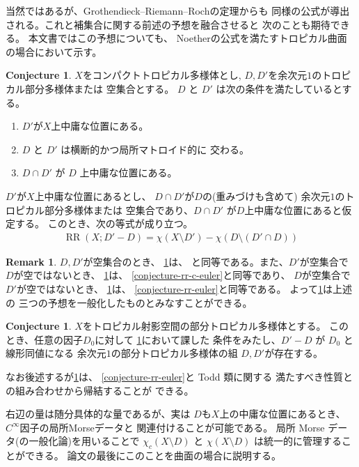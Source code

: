 \documentclass[a4paper,dvipdfmx,reqno,12pt]{amsart}
\theoremstyle{definition}
\newtheorem{conjecture}[theorem]{Conjecture}
\newtheorem{remark}[theorem]{Remark}
\newcommand{\opn}[1]{\operatorname{#1}}
\numberwithin{equation}{section}
\begin{document}
当然ではあるが、Grothendieck--Riemann--Rochの定理からも
同様の公式が導出される。これと補集合に関する前述の予想を融合させると
次のことも期待できる。
本文書ではこの予想についても、
Noetherの公式を満たすトロピカル曲面の場合において示す。
\begin{conjecture}
\label{conjecture-rr-bertini}
$X$をコンパクトトロピカル多様体とし, 
$D,D'$を余次元$1$のトロピカル部分多様体または
空集合とする。
$D$ と $D'$ は次の条件を満たしているとする。
\begin{enumerate}
\item $D'$が$X$上中庸な位置にある。
\item $D$ と $D'$ は横断的かつ局所マトロイド的に
交わる。
\item $D\cap D'$ が $D$ 上中庸な位置にある。
\end{enumerate}

$D'$が$X$上中庸な位置にあるとし、
$D\cap D'$が$D$の(重みづけも含めて)
余次元$1$のトロピカル部分多様体または
空集合であり、$D\cap D'$ が$D$上中庸な位置にあると仮定する。
このとき、次の等式が成り立つ。
\begin{align}
\opn{RR}(X;D'-D)=\chi (X\setminus D')-
\chi(D\setminus (D'\cap D))
\end{align}

\end{conjecture}

\begin{remark}
$D,D'$が空集合のとき、
\cref{conjecture-rr-bertini}は、
\cite[Conjecture 6.13]{demedrano2023chern}
と同等である。また、$D'$が空集合で$D$が空ではないとき、
\cref{conjecture-rr-bertini}は、
\cref{conjecture-rr-c-euler}と同等であり、
$D$が空集合で$D'$が空ではないとき、
\cref{conjecture-rr-bertini}は、
\cref{conjecture-rr-euler}と同等である。
よって\cref{conjecture-rr-bertini}は上述の
三つの予想を一般化したものとみなすことができる。
\end{remark}

\begin{conjecture}
$X$をトロピカル射影空間の部分トロピカル多様体とする。
このとき、任意の因子$D_0$に対して
\cref{conjecture-rr-bertini}において課した
条件をみたし、$D'-D$ が $D_0$ と線形同値になる
余次元$1$の部分トロピカル多様体の組
$D,D'$が存在する。
\end{conjecture}



なお後述するが\cref{conjecture-rr-bertini}は、
\cref{conjecture-rr-euler}と Todd 類に関する
満たすべき性質との組み合わせから帰結することが
できる。

右辺の量は随分具体的な量であるが、実は
$D$も$X$上の中庸な位置にあるとき、
$C^{\infty}$因子の局所Morseデータと
関連付けることが可能である。
局所 Morse データ(の一般化論)を用いることで
$\chi_c(X\setminus D)$ と
$\chi (X\setminus D)$
は統一的に管理することができる。
論文の最後にこのことを曲面の場合に説明する。
\end{document}
